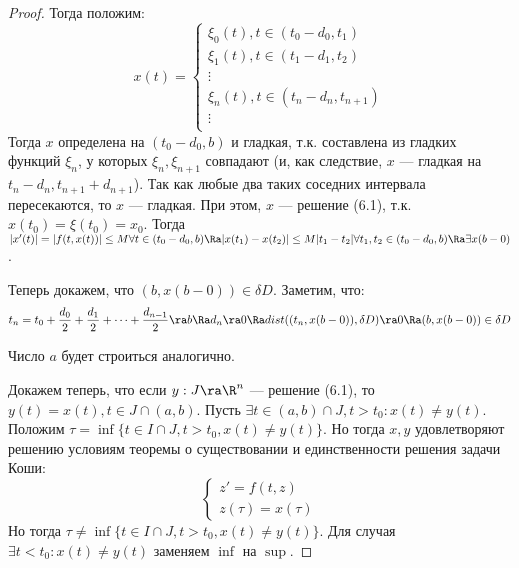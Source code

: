 \begin{proof}
    Тогда положим:
    \[x(t) = \left\{\begin{array}{l}
        \xi_0(t), t \in (t_0 - d_0, t_1) \\
        \xi_1(t), t \in (t_1 - d_1, t_2) \\
        \vdots \\
        \xi_n(t), t \in (t_n - d_n, t_{n + 1}) \\
        \vdots \\
    \end{array}\right.\]
    Тогда \(x\) определена на \((t_0 - d_0, b)\) и гладкая, т.к. составлена из гладких функций \(\xi_n\), у которых \(\xi_n, \xi_{n + 1}\) совпадают (и, как следствие, \(x\) --- гладкая на \(t_{n} - d_n, t_{n + 1} + d_{n + 1}\)). Так как любые два таких соседних интервала пересекаются, то \(x\) --- гладкая. При этом, \(x\) --- решение (6.1), т.к. \(x(t_0) = \xi(t_0) = x_0\). Тогда \(|x'(t)| = |f(t, x(t))| \le M \forall t \in (t_0 - d_0, b) \Ra |x(t_1) - x(t_2)| \le M|t_1 - t_2| \forall t_1, t_2 \in (t_0 - d_0, b) \Ra \exists x(b - 0)\).

    Теперь докажем, что \((b, x(b - 0)) \in \delta D\). Заметим, что:
    \[t_n = t_0 + \frac{d_0}{2} + \frac{d_1}{2} + \dots  + \frac{d_{n - 1}}{2} \ra b \Ra d_n \ra 0 \Ra dist((t_n, x(b - 0)), \delta D) \ra 0 \Ra (b, x(b - 0)) \in \delta D\]

    Число \(a\) будет строиться аналогично.

    Докажем теперь, что если \(y: J \ra \R^n\) --- решение (6.1), то \(y(t) = x(t), t \in J \cap (a, b)\). Пусть \(\exists t \in (a, b) \cap J, t > t_0: x(t) \ne y(t)\). Положим \(\tau = \inf\{t \in I \cap J, t > t_0, x(t) \ne y(t)\}\). Но тогда \(x, y\) удовлетворяют решению условиям теоремы о существовании и единственности решения задачи Коши:
    \begin{equation*}
        \begin{cases}
            z' = f(t, z) \\
            z(\tau) = x(\tau)
        \end{cases}
    \end{equation*}
    Но тогда \(\tau \ne \inf\{t \in I \cap J, t > t_0, x(t) \ne y(t)\}\). Для случая \(\exists t < t_0: x(t) \ne y(t)\) заменяем \(\inf\) на \(\sup\).
\end{proof}

